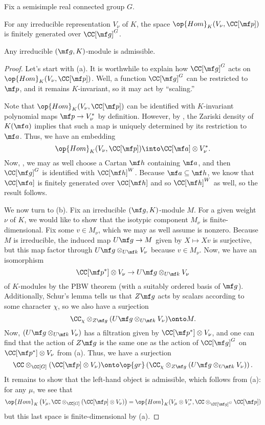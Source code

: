 \documentclass[../notes.tex]{subfiles}
\begin{document}
\begin{corollary}
	Fix a semisimple real connected group $G$.
	\begin{listalph}
		\item For any irreducible representation $V_\nu$ of $K$, the space $\op{Hom}_K(V_\nu,\CC[\mf p])$ is finitely generated over $\CC[\mf g]^G$.
		\item Any irreducible $(\mf g,K)$-module is admissible.
	\end{listalph}
\end{corollary}
\begin{proof}
	Let's start with (a). It is worthwhile to explain how $\CC[\mf g]^G$ acts on $\op{Hom}_K(V_\nu,\CC[\mf p])$. Well, a function $\CC[\mf g]^G$ can be restricted to $\mf p$, and it remains $K$-invariant, so it may act by ``scaling.''

	Note that $\op{Hom}_K(V_\nu,\CC[\mf p])$ can be identified with $K$-invariant polynomial maps $\mf p\to V_\nu^*$ by definition. However, by , the Zariski density of $K(\mf a)$ implies that such a map is uniquely determined by its restriction to $\mf a$. Thus, we have an embedding
	\[\op{Hom}_K(V_\nu,\CC[\mf p])\into\CC[\mf a]\otimes V_\nu^*.\]
	Now, , we may as well choose a Cartan $\mf h$ containing $\mf a$, and then $\CC[\mf g]^G$ is identified with $\CC[\mf h]^W$. Because $\mf a\subseteq\mf h$, we know that $\CC[\mf a]$ is finitely generated over $\CC[\mf h]$ and so $\CC[\mf h]^W$ as well, so the result follows.

	We now turn to (b). Fix an irreducible $(\mf g,K)$-module $M$. For a given weight $\nu$ of $K$, we would like to show that the isotypic component $M_\nu$ is finite-dimensional. Fix some $v\in M_\nu$, which we may as well assume is nonzero. Because $M$ is irreducible, the induced map $U\mf g\to M$ given by $X\mapsto Xv$ is surjective, but this map factor through $U\mf g\otimes_{U\mf k}V_\nu$ because $v\in M_\nu$. Now, we have an isomorphism
	\[\CC[\mf p^*]\otimes V_\nu\to U\mf g\otimes_{U\mf k}V_\nu\]
	of $K$-modules by the PBW theorem (with a suitably ordered basis of $\mf g$). Additionally, Schur's lemma tells us that $Z\mf g$ acts by scalars according to some character $\chi$, so we also have a surjection
	\[\CC_\chi\otimes_{Z\mf g}(U\mf g\otimes_{U\mf k}V_\nu)\onto M.\]
	Now, $(U\mf g\otimes_{U\mf k}V_\nu)$ has a filtration given by $\CC[\mf p^*]\otimes V_\nu$, and one can find that the action of $Z\mf g$ is the same one as the action of $\CC[\mf g]^G$ on $\CC[\mf p^*]\otimes V_\nu$ from (a). Thus, we have a surjection
	\[\CC\otimes_{\CC[G]}(\CC[\mf p]\otimes V_\nu)\onto\op{gr}\left(\CC_\chi\otimes_{Z\mf g}(U\mf g\otimes_{U\mf k}V_\nu)\right).\]
	It remains to show that the left-hand object is admissible, which follows from (a): for any $\mu$, we see that
	\[\op{Hom}_K\left(V_\mu,\CC\otimes_{\CC[G]}(\CC[\mf p]\otimes V_\nu)\right)=\op{Hom}_K(V_\mu\otimes V_\nu^*,\CC\otimes_{\CC[\mf g]^G}\CC[\mf p])\]
	but this last space is finite-dimensional by (a).
\end{proof}
\end{document}
